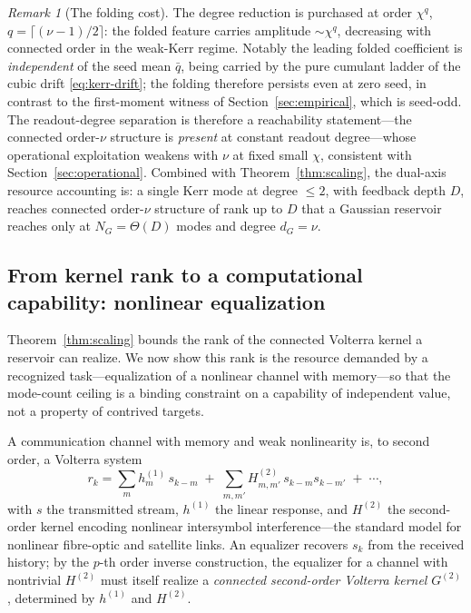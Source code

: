 \documentclass[11pt]{article}
\theoremstyle{remark}
\newtheorem{remark}{Remark}
\begin{document}
\begin{remark}[The folding cost]
The degree reduction is purchased at order $\chi^{q}$, $q=\lceil(\nu-1)/2\rceil$:
the folded feature carries amplitude $\sim\chi^{q}$, decreasing with connected
order in the weak-Kerr regime. Notably the leading folded coefficient is
\emph{independent} of the seed mean $\bar q$, being carried by the pure cumulant
ladder of the cubic drift \eqref{eq:kerr-drift}; the folding therefore persists
even at zero seed, in contrast to the first-moment witness of
Section~\ref{sec:empirical}, which is seed-odd. The readout-degree separation is therefore a reachability
statement---the connected order-$\nu$ structure is \emph{present} at constant
readout degree---whose operational exploitation weakens with $\nu$ at fixed small
$\chi$, consistent with Section~\ref{sec:operational}. Combined with
Theorem~\ref{thm:scaling}, the dual-axis resource accounting is: a single Kerr
mode at degree $\le2$, with feedback depth $D$, reaches connected order-$\nu$
structure of rank up to $D$ that a Gaussian reservoir reaches only at
$N_G=\Theta(D)$ modes and degree $d_G=\nu$.
\end{remark}

\subsection{From kernel rank to a computational capability: nonlinear equalization}
\label{sec:capability}

Theorem~\ref{thm:scaling} bounds the rank of the connected Volterra kernel a
reservoir can realize. We now show this rank is the resource demanded by a
recognized task---equalization of a nonlinear channel with memory---so that the
mode-count ceiling is a binding constraint on a capability of independent value,
not a property of contrived targets.

A communication channel with memory and weak nonlinearity is, to second order, a
Volterra system
\begin{equation}
r_k = \sum_m h^{(1)}_m\,s_{k-m}
\;+\; \sum_{m,m'} H^{(2)}_{m,m'}\,s_{k-m}s_{k-m'} \;+\;\cdots,
\label{eq:channel}
\end{equation}
with $s$ the transmitted stream, $h^{(1)}$ the linear response, and $H^{(2)}$ the
second-order kernel encoding nonlinear intersymbol interference---the standard
model for nonlinear fibre-optic and satellite links. An equalizer recovers $s_k$
from the received history; by the $p$-th order inverse construction, the
equalizer for a channel with nontrivial $H^{(2)}$ must itself realize a
\emph{connected second-order Volterra kernel} $G^{(2)}$, determined by $h^{(1)}$
and $H^{(2)}$.
\end{document}
